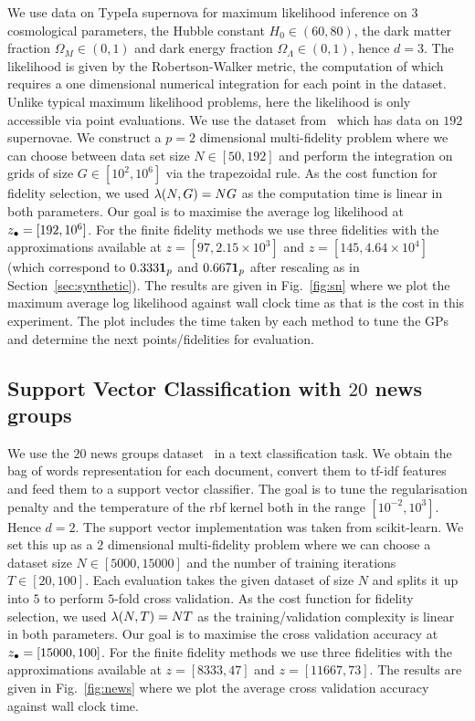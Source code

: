 \label{sec:sn}


We use data on TypeIa supernova for maximum likelihood
inference on $3$ cosmological parameters, the Hubble constant $H_0\in(60,80)$, the
dark matter fraction $\Omega_M\in(0,1)$ and dark energy fraction $\Omega_\Lambda\in(0,1)$,
hence $d=3$.
The likelihood is given by the Robertson-Walker metric, the computation of which
requires a one dimensional numerical integration for each point in the dataset.
Unlike typical maximum likelihood problems, here the likelihood is only accessible
via point evaluations.
\insertRealResultsFigure
We use the dataset from~\citet{davis07supernovae} which has data on $192$ supernovae.
We construct a $p=2$ dimensional multi-fidelity problem where we can choose 
between data set size $N\in[50,192]$ and perform the integration on grids of size 
$G\in[10^2, 10^6]$ via the trapezoidal rule.
As the cost function for fidelity selection, we used $\lambda(N,G) = NG$ as
the computation time is linear in both parameters.
Our goal is to maximise the average log likelihood at $z_{\bullet}=[192, 10^6]$.
For the finite fidelity methods we use three fidelities with the approximations available
at $z=[97,2.15\times 10^3]$ and $z=[145, 4.64\times 10^4]$ (which correspond to
$0.333{\bf 1}_p$ and $0.667{\bf 1}_p$ after rescaling as in Section~\ref{sec:synthetic}).
The results are given in Fig.~\ref{fig:sn} where we plot the maximum average log
likelihood against wall clock time as that is the cost in this experiment.
The plot includes the time taken by each method to tune the GPs and determine the next
points/fidelities for evaluation.


\subsection{Support Vector Classification with $20$ news groups}
\label{sec:news}

We use the $20$ news groups dataset~\cite{joachims1996probabilistic} in a text
classification task.
We obtain the bag of words representation for each document, convert them to tf-idf
features and feed them to a support vector classifier.
The goal is to tune the regularisation penalty and the temperature of the rbf kernel
both in the range $[10^{-2}, 10^3]$. Hence $d=2$.
The support vector implementation was taken from scikit-learn.
We set this up as a $2$ dimensional multi-fidelity problem where we can choose
a dataset size $N\in[5000, 15000]$ and the number of training iterations
$T\in[20, 100]$.
Each evaluation takes the given dataset of size $N$ and splits it up into $5$ to perform
$5$-fold cross validation.
As the cost function for fidelity selection, we used $\lambda(N,T) = NT$ as
the training/validation complexity is linear in both parameters.
Our goal is to maximise the cross validation accuracy at $z_{\bullet} = [15000, 100]$.
For the finite fidelity methods we use three fidelities with the approximations available
at $z=[8333,47]$ and $z=[11667, 73]$.
The results are given in Fig.~\ref{fig:news} where we plot the average cross validation
accuracy against wall clock time.




